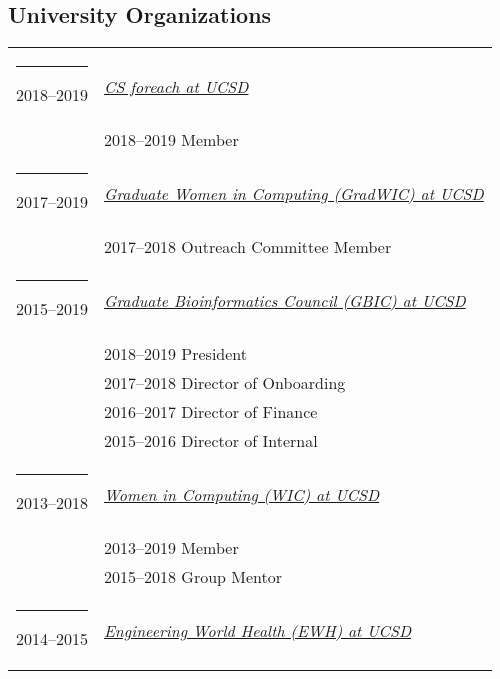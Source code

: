 \documentclass[margin,line]{res}
\begin{document}
\begin{resume}
\section{\sc University Organizations}
\begin{longtable}{@{}p{0.7in}p{4in}}\rule{-1mm}{4.5mm}
\hspace*{-4mm} 2018--2019 & \href{http://csforeach.ucsd.edu/}{\textit{CS foreach at UCSD}}\\*
\hspace*{-4mm} & \hspace{4mm} 2018--2019 Member\\
\hspace*{-4mm} \rule{-1mm}{5mm} 2017--2019 & \href{http://gradwic.ucsd.edu/}{\textit{Graduate Women in Computing (GradWIC) at UCSD}}\\*
\hspace*{-4mm} & \hspace{4mm} 2017--2018 Outreach Committee Member\\
\hspace*{-4mm} \rule{-1mm}{5mm} 2015--2019 & \href{http://bioinformatics.ucsd.edu/node/1141}{\textit{Graduate Bioinformatics Council (GBIC) at UCSD}}\\*
\hspace*{-4mm} & \hspace{4mm} 2018--2019 President\\*
\hspace*{-4mm} & \hspace{4mm} 2017--2018 Director of Onboarding\\*
\hspace*{-4mm} & \hspace{4mm} 2016--2017 Director of Finance\\*
\hspace*{-4mm} & \hspace{4mm} 2015--2016 Director of Internal\\
\hspace*{-4mm} \rule{-1mm}{5mm} 2013--2018 & \href{http://wic.ucsd.edu/}{\textit{Women in Computing (WIC) at UCSD}}\\*
\hspace*{-4mm} & \hspace{4mm} 2013--2019 Member\\*
\hspace*{-4mm} & \hspace{4mm} 2015--2018 Group Mentor\\
\hspace*{-4mm} \rule{-1mm}{5mm} 2014--2015 & \href{http://ewh.ucsd.edu/}{\textit{Engineering World Health (EWH) at UCSD}}\\

\end{longtable}
\end{resume}
\end{document}
